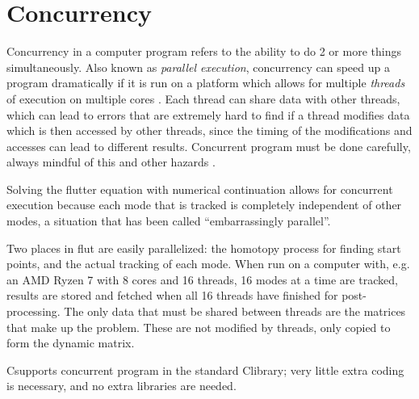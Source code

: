 \documentclass[11pt,openany,twoside]{book}
\numberwithin{equation}{section}		%
\def\Cpp{{C\nolinebreak[4]\hspace{-.05em}\raisebox{.4ex}{\tiny\bf ++}}\:}
\newcommand{\Cmd}[1]{{\sf #1}}
\newcommand{\Newterm}[1]{{\em #1}}
\begin{document}
\section{Concurrency}\label{sect:concurrency}
Concurrency in a computer program refers to the ability to do 2 or
more things simultaneously. Also known as \Newterm{parallel execution},
concurrency can speed up a program dramatically if it is run on a platform
which allows for multiple \Newterm{threads} of execution on multiple cores
\cite{williams2009c++}.
Each thread can share data with other threads, which can lead to errors that
are extremely hard to find if a thread modifies data which is then accessed by
other threads, since the timing of the modifications and accesses can lead
to different results. Concurrent program must be done carefully, always mindful
of this and other hazards
\cite{williams2009c++}.
\par
Solving the flutter equation with numerical continuation allows for
concurrent execution because each mode that is tracked is completely
independent of other modes, a situation that has been called
``embarrassingly parallel''.
\par
Two places in \Cmd{flut} are easily parallelized: the homotopy process for
finding start points, and the actual tracking of each mode. When run on a
computer with, e.g. an AMD Ryzen 7 with 8 cores and 16 threads, 16 modes
at a time are tracked, results are stored and fetched when all 16 threads have
finished for post-processing.
The only data that must be shared between threads are the matrices that
make up the problem. These are not modified by threads, only copied to form
the dynamic matrix.
\par
\Cpp supports concurrent program in the standard \Cpp library; very little extra
coding is necessary, and no extra libraries are needed.
\end{document}

